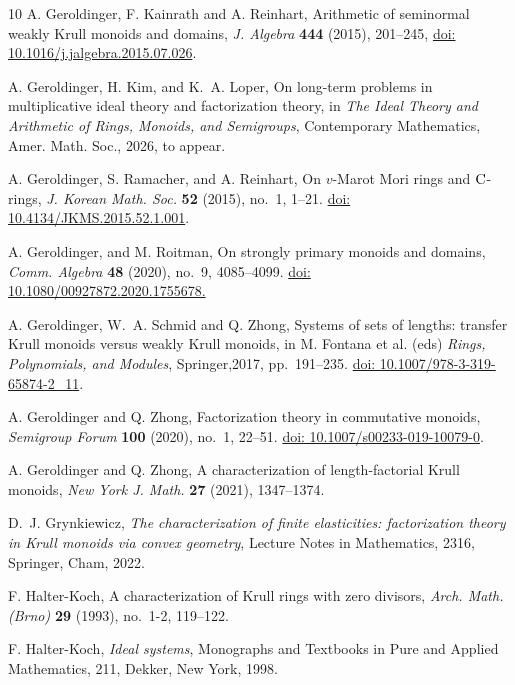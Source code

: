 \documentclass[a4paper, 10pt]{amsart}
\theoremstyle{plain}
\theoremstyle{definition}
\theoremstyle{remark}
\numberwithin{equation}{section}
\begin{document}
\begin{thebibliography}{10}
 A. Geroldinger, F. Kainrath and A. Reinhart, Arithmetic of seminormal weakly Krull monoids and domains, {\it J. Algebra} {\bf 444} (2015), 201--245, \href{https://doi.org/10.1016/j.jalgebra.2015.07.026}{doi: 10.1016/j.jalgebra.2015.07.026}.

 A. Geroldinger, H. Kim, and K.~A. Loper, On long-term problems in multiplicative ideal theory and factorization theory, in {\it {T}he {I}deal {T}heory and {A}rithmetic of {R}ings, {M}onoids, and {S}emigroups}, Contemporary {M}athematics, Amer. Math. Soc., 2026, to appear.

 A. Geroldinger, S. Ramacher, and A. Reinhart, On $v$-{M}arot {M}ori rings
  and $\rm{C}$-rings, {\it J. Korean Math. Soc.} \textbf{52} (2015), no.~1, 1--21. \href{https://doi.org/10.4134/JKMS.2015.52.1.001}{doi: 10.4134/JKMS.2015.52.1.001}.

 A. Geroldinger, and M. Roitman, On strongly primary monoids and domains, {\it Comm. Algebra} {\bf 48} (2020), no.~9, 4085--4099. \href{https://doi.org/10.1080/00927872.2020.1755678}{doi: 10.1080/00927872.2020.1755678.}

 A. Geroldinger, W.~A. Schmid and Q. Zhong, Systems of sets of lengths: transfer {K}rull monoids versus weakly {K}rull monoids, in M. Fontana et al. (eds) \emph{Rings, Polynomials, and Modules}, Springer,2017, pp.~191--235. \href{https://doi.org/10.1007/978-3-319-65874-2_11}{doi: 10.1007/978-3-319-65874-2\_11}.

 A. Geroldinger and Q. Zhong, Factorization theory in commutative monoids, {\it Semigroup Forum} {\bf 100} (2020), no.~1, 22--51. \href{https://doi.org/10.1007/s00233-019-10079-0}{doi: 10.1007/s00233-019-10079-0}.

 A. Geroldinger and Q. Zhong, A characterization of length-factorial Krull monoids, {\it New York J. Math.} {\bf 27} (2021), 1347--1374.

 D.~J. Grynkiewicz, {\it The characterization of finite elasticities: factorization theory in Krull monoids via convex geometry}, Lecture Notes in Mathematics, 2316, Springer, Cham, 2022.

 F. Halter-Koch, A characterization of Krull rings with zero divisors, {\it Arch. Math. (Brno)} {\bf 29} (1993), no.~1-2, 119--122.

 F. Halter-Koch, {\it Ideal systems}, Monographs and Textbooks in Pure and Applied Mathematics, 211, Dekker, New York, 1998.


\end{thebibliography}
\end{document}
